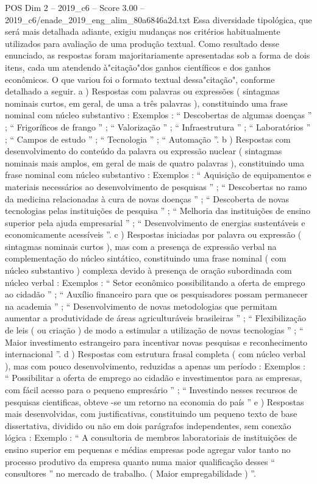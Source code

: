 \begin{textsample}{POS Dim 2 – 2019\_c6 – Score 3.00 – 2019\_c6/enade\_2019\_eng\_alim\_80a6846a2d.txt}
Essa diversidade tipológica, que será mais detalhada adiante, exigiu mudanças nos critérios habitualmente utilizados para avaliação de uma produção textual.
Como resultado desse enunciado, as respostas foram majoritariamente apresentadas sob a forma de dois itens, cada um atendendo à"citação"dos ganhos científicos e dos ganhos econômicos.
O que variou foi o formato textual dessa"citação", conforme detalhado a seguir. a ) Respostas com palavras ou expressões ( sintagmas nominais curtos, em geral, de uma a três palavras ), constituindo uma frase nominal com núcleo substantivo : Exemplos : “ Descobertas de algumas doenças ” ; “ Frigoríficos de frango ” ; “ Valorização ” ; “ Infraestrutura ” ; “ Laboratórios ” ; “ Campos de estudo ” ; “ Tecnologia ” ; “ Automação ”. b ) Respostas com desenvolvimento do conteúdo da palavra ou expressão nuclear ( sintagmas nominais mais amplos, em geral de mais de quatro palavras ), constituindo uma frase nominal com núcleo substantivo : Exemplos : “ Aquisição de equipamentos e materiais necessários ao desenvolvimento de pesquisas ” ; “ Descobertas no ramo da medicina relacionadas à cura de novas doenças ” ; “ Descoberta de novas tecnologias pelas instituições de pesquisa ” ; “ Melhoria das instituições de ensino superior pela ajuda empresarial ” ; “ Desenvolvimento de energias sustentáveis e economicamente acessíveis ”. c ) Respostas iniciadas por palavra ou expressão ( sintagmas nominais curtos ), mas com a presença de expressão verbal na complementação do núcleo sintático, constituindo uma frase nominal ( com núcleo substantivo ) complexa devido à presença de oração subordinada com núcleo verbal : Exemplos : “ Setor econômico possibilitando a oferta de emprego ao cidadão ” ; “ Auxílio financeiro para que os pesquisadores possam permanecer na academia ” ; “ Desenvolvimento de novas metodologias que permitam aumentar a produtividade de áreas agriculturáveis brasileiras ” ; “ Flexibilização de leis ( ou criação ) de modo a estimular a utilização de novas tecnologias ” ; “ Maior investimento estrangeiro para incentivar novas pesquisas e reconhecimento internacional ”. d ) Respostas com estrutura frasal completa ( com núcleo verbal ), mas com pouco desenvolvimento, reduzidas a apenas um período : Exemplos : “ Possibilitar a oferta de emprego ao cidadão e investimentos para as empresas, com fácil acesso para o pequeno empresário ” ; “ Investindo nesses recursos de pesquisas cientificas, obteve -se um retorno na economia do país ” e ) Respostas mais desenvolvidas, com justificativas, constituindo um pequeno texto de base dissertativa, dividido ou não em dois parágrafos independentes, sem conexão lógica : Exemplo : “ A consultoria de membros laboratoriais de instituições de ensino superior em pequenas e médias empresas pode agregar valor tanto no processo produtivo da empresa quanto numa maior qualificação desses “ consultores ” no mercado de trabalho. ( Maior empregabilidade ) ”.

\end{textsample}
